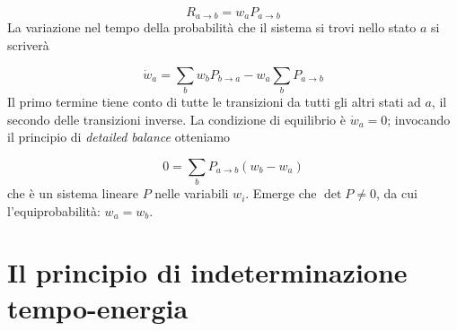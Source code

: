 \documentclass[a4paper]{report}
\begin{document}
\begin{equation}
    R_{a\rightarrow b} = w_a P_{a\rightarrow b}
\end{equation}
La variazione nel tempo della probabilità che il sistema si trovi nello stato $a$ si scriverà

\begin{equation}
    \dot{w}_a = \sum_b w_b P_{b\rightarrow a}- w_a \sum_b P_{a\rightarrow b}
\end{equation}
Il primo termine tiene conto di tutte le transizioni da tutti gli altri stati ad $a$, il secondo delle transizioni inverse. La condizione di equilibrio è $\dot{w}_a = 0$; invocando il principio di \textit{detailed balance} otteniamo

\begin{equation}
    0 = \sum_b P_{a\rightarrow b}(w_b-w_a)
\end{equation}
che è un sistema lineare $P$ nelle variabili $w_i$. Emerge che $\det P \neq 0$, da cui l'equiprobabilità: $w_a = w_b$.

\section{Il principio di indeterminazione tempo-energia}
\end{document}

